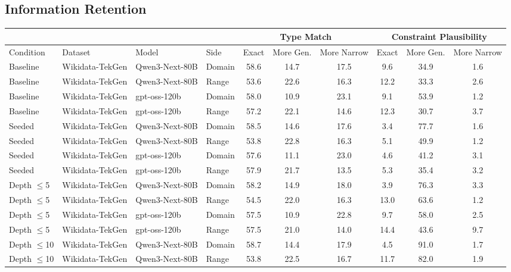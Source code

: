 \documentclass[11pt]{article}
\begin{document}
\subsection{Information Retention}
\label{sec:eval-mine}

\begin{table}[t]
\centering
\small
\begin{tabular}{llll ccc ccc}
\toprule
& & & & \multicolumn{3}{c}{Type Match} & \multicolumn{3}{c}{Constraint Plausibility} \\
\midrule
Condition & Dataset & Model & Side & Exact & More Gen. & More Narrow & Exact & More Gen. & More Narrow \\
\midrule
Baseline & Wikidata-TekGen & Qwen3-Next-80B & Domain & 58.6 & 14.7 & 17.5 & 9.6  & 34.9 & 1.6 \\
Baseline & Wikidata-TekGen & Qwen3-Next-80B & Range  & 53.6 & 22.6 & 16.3 & 12.2 & 33.3 & 2.6 \\
Baseline & Wikidata-TekGen & gpt-oss-120b   & Domain & 58.0 & 10.9 & 23.1 & 9.1  & 53.9 & 1.2 \\
Baseline & Wikidata-TekGen & gpt-oss-120b   & Range  & 57.2 & 22.1 & 14.6 & 12.3 & 30.7 & 3.7 \\
\cmidrule(lr){1-10}
Seeded & Wikidata-TekGen & Qwen3-Next-80B & Domain & 58.5 & 14.6 & 17.6 & 3.4  & 77.7 & 1.6 \\
Seeded & Wikidata-TekGen & Qwen3-Next-80B & Range  & 53.8 & 22.8 & 16.3 & 5.1  & 49.9 & 1.2 \\
Seeded & Wikidata-TekGen & gpt-oss-120b   & Domain & 57.6 & 11.1 & 23.0 & 4.6  & 41.2 & 3.1 \\
Seeded & Wikidata-TekGen & gpt-oss-120b   & Range  & 57.9 & 21.7 & 13.5 & 5.3  & 35.4 & 3.2 \\
\cmidrule(lr){1-10}
Depth $\leq$5 & Wikidata-TekGen & Qwen3-Next-80B & Domain & 58.2 & 14.9 & 18.0 & 3.9  & 76.3 & 3.3 \\
Depth $\leq$5 & Wikidata-TekGen & Qwen3-Next-80B & Range  & 54.5 & 22.0 & 16.3 & 13.0 & 63.6 & 1.2 \\
Depth $\leq$5 & Wikidata-TekGen & gpt-oss-120b   & Domain & 57.5 & 10.9 & 22.8 & 9.7  & 58.0 & 2.5 \\
Depth $\leq$5 & Wikidata-TekGen & gpt-oss-120b   & Range  & 57.5 & 21.0 & 14.0 & 14.4 & 43.6 & 9.7 \\
\cmidrule(lr){1-10}
Depth $\leq$10 & Wikidata-TekGen & Qwen3-Next-80B & Domain & 58.7 & 14.4 & 17.9 & 4.5  & 91.0 & 1.7 \\
Depth $\leq$10 & Wikidata-TekGen & Qwen3-Next-80B & Range  & 53.8 & 22.5 & 16.7 & 11.7 & 82.0 & 1.9 \\

\end{tabular}
\end{table}
\end{document}
